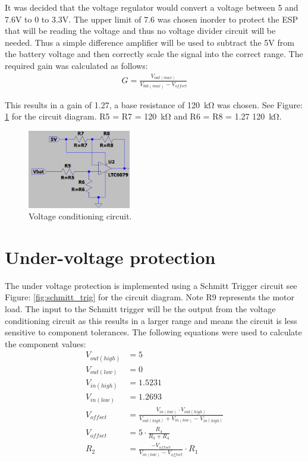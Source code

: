 It was decided that the voltage regulator would convert a voltage between 5 and 7.6V to 0 to 3.3V. The upper limit of 7.6 was chosen inorder to protect the ESP that will be reading the voltage and thus no voltage divider circuit will be needed. Thus a simple difference amplifier will be used to subtract the 5V from the battery voltage and then correctly scale the signal into the correct range. The required gain was calculated as follows:
\begin{align*}
G = \frac{V_{out(max)}}{V_{bat(max)} - V_{offset}}
\end{align*}

This results in a gain of 1.27, a base resistance of \SI{120}{\kilo\ohm} was chosen. See Figure: \ref{fig:volt_cond} for the circuit diagram. R5 = R7 = \SI{120}{\kilo\ohm}  and R6 = R8 = 1.27 \SI{120}{\kilo\ohm}.

\begin{figure}[H]
\centering
\includegraphics[width = 0.4\textwidth]{./Figures/Volt_Cond.png}
\caption{Voltage conditioning circuit.}
\label{fig:volt_cond}
\end{figure}


\clearpage
\section{Under-voltage protection}

The under voltage protection is implemented using a Schmitt Trigger circuit see Figure: \ref{fig:schmitt_trig} for the circuit diagram. Note R9 represents the motor load. The input to the Schmitt trigger will be the output from the voltage  conditioning circuit as this results in a larger range and means the circuit is less sensitive to component tolerances. The following equations were used to calculate the component values:
\begin{align*}
V_{out(high)} & = 5\\
V_{out(low)} & = 0\\
V_{in(high)} & = 1.5231\\
V_{in(low)} & = 1.2693\\
V_{offset} &=\frac{V_{in(low)} \cdot V_{out(high)}}{V_{out(high)} + V_{in(low)} - V_{in(high)}}\\
V_{offset} &=5 \cdot \frac{R_4}{R_3+R_4}\\
R_2 &= \frac{-V_{offset}}{V_{in(low)}-V_{offset}} \cdot R_1\\
\end{align*}


